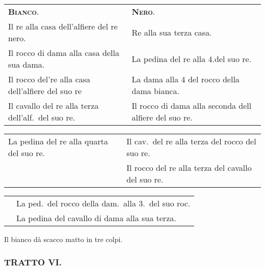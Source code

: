 \documentclass[11pt,a6paper]{article}
\begin{document}
{\small
\noindent
\begin{tabular}{@{}p{3.84cm}p{3.84cm}}
{\bfseries\scshape Bianco}.& {\bfseries\scshape Nero}.\\
Il re alla casa dell'alfiere del re nero.& Re alla sua terza casa.\\
Il rocco di dama alla casa della sua dama.& La pedina del re alla 4.del suo re.\\
Il rocco del're alla casa dell'alfiere del suo re& La dama alla 4 del rocco della dama bianca.\\
Il cavallo del re alla terza dell'alf.\ del suo re.& Il rocco di dama alla seconda dell alfiere del suo re.\\
\end{tabular}

\noindent\begin{tabular}{@{}p{3.84cm}p{3.84cm}}
La pedina del re alla quarta del suo re.& Il cav.\ del re alla terza del rocco del suo re.\\
& Il rocco del re alla terza del cavallo del suo re.\\
\end{tabular}

\noindent\begin{tabular}{@{}p{3.84cm}p{3.84cm}}
& La ped.\ del rocco della dam.\ alla 3.\ del suo roc.\\
& La pedina del cavallo di dama alla sua terza.
\end{tabular}}

Il bianco dà scacco matto in tre colpi.



\subsubsection{TRATTO VI.}
\end{document}
